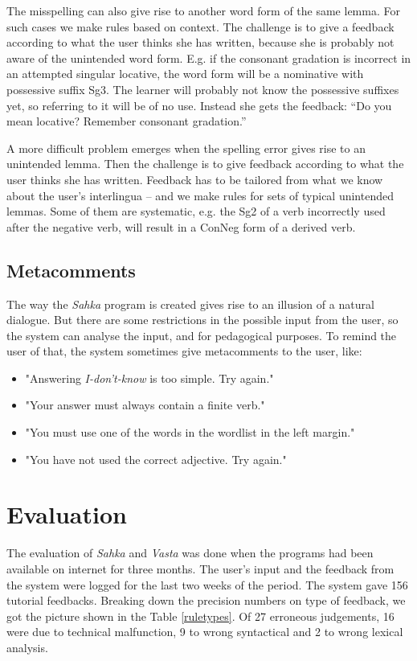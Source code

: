 \documentclass[11pt]{article}
\begin{document}
The misspelling can also give rise to another word form of the same lemma. For such cases we make rules based on context. The challenge is to give a feedback according to what the user thinks she has written, because she is probably not aware of the unintended word form. E.g. if the consonant gradation is incorrect in an attempted singular locative, the word form will be a nominative with possessive suffix Sg3. The learner will probably not know the possessive suffixes yet, so referring to it will be of no use. Instead she gets the feedback: “Do you mean locative? Remember consonant gradation.” 

A more difficult problem emerges when the spelling error gives rise to an unintended lemma. Then the challenge is to give feedback according to what the user thinks she has written. Feedback has to be tailored from what we know about the user’s interlingua – and we make rules for sets of typical unintended lemmas. Some of them are systematic, e.g. the Sg2 of a verb incorrectly used after the negative verb, will result in a ConNeg form of a derived verb.  


\subsection{Metacomments}
The way the \textit{Sahka} program is created gives rise to an illusion of a natural dialogue. But there are some restrictions in the possible input from the user, so the system can analyse the input, and for pedagogical purposes. To remind the user of that, the system sometimes give metacomments to the user, like:
\begin{itemize}
\setlength{\itemsep}{-0.2cm}
\item "Answering \textit{I-don't-know} is too simple. Try again."
\item "Your answer must always contain a finite verb."
\item "You must use one of the words in the wordlist in the left margin."
\item "You have not used the correct adjective. Try again."
\end{itemize}



\section{Evaluation}
The evaluation of \textit{Sahka} and \textit{Vasta} was done when the programs had been available on internet for three months. The user's input and the feedback from the system were logged for the last two weeks of the period. The system gave 156 tutorial feedbacks. Breaking down the precision numbers on type of feedback, we got the picture shown in the Table \ref{ruletypes}. Of 27 erroneous judgements, 16 were due to technical malfunction, 9 to wrong syntactical and 2 to wrong lexical analysis. \\
\end{document}
